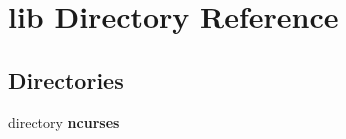\section{lib Directory Reference}
\label{dir_97aefd0d527b934f1d99a682da8fe6a9}
\subsection*{Directories}
\begin{DoxyCompactItemize}
\item 
directory \textbf{ ncurses}
\end{DoxyCompactItemize}

